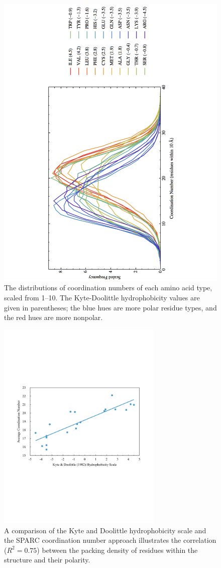 \documentclass[11pt,titlepage]{article}
\begin{document}
\begin{figure}
	\begin{center}
	\includegraphics[trim={4cm 0cm 4cm 0cm}, height=0.8\textwidth,angle=-90]{hydrophobicity_graph}
	\end{center}
	\caption{The distributions of coordination numbers of each amino acid type, scaled from 1--10. The Kyte-Doolittle hydrophobicity values are given in parentheses; the blue hues are more polar residue types, and the red hues are more nonpolar.}
	\label{hydrophobicities}
\end{figure}


\begin{figure}
	\begin{center}
		\includegraphics[trim=1cm 8cm 1cm 8cm, width=0.7\textwidth,keepaspectratio]{hydrophobicity_correlation}
	\end{center}
	\caption{A comparison of the Kyte and Doolittle hydrophobicity scale and the SPARC coordination number approach illustrates the correlation ($R^2=0.75$) between the packing density of residues within the structure and their polarity.}
	\label{hydrophobicity_corr}
\end{figure}
\end{document}
